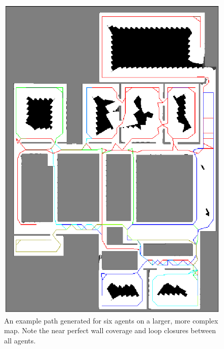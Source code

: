 \documentclass[letterpaper, 10 pt, conference]{ieeeconf}  %
\begin{document}
\begin{figure}
\centering
\includegraphics[width=1.0\linewidth]{six_agent_path.png}
\caption[An example path generated for six agents on a large complex map]{An example path generated for six agents on a larger, more complex map. Note the near perfect wall coverage and loop closures between all agents.}
\label{fig:six_path}
\end{figure}
\end{document}

